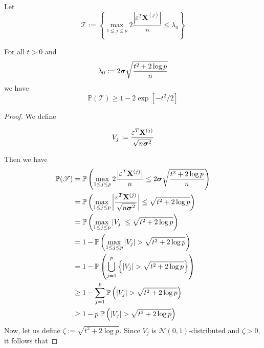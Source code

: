 Let
$$\mathscr{T} := \left\{\max _{1 \leq j \leq p} 2 \frac{\left| \varepsilon^{T} \mathbf{X}^{(j)}\right|}{n} \leq \lambda_{0}\right\}$$

\begin{lemma}[Lemma 6.2.]
    For all $t > 0$ and
    $$\lambda_{0}:=2 \boldsymbol{\sigma} \sqrt{\frac{t^{2}+2 \log p}{n}}$$
    we have
    $$\mathbb{P}(\mathscr{T}) \geq 1-2 \exp \left[-t^{2} / 2\right]$$
\end{lemma}
\begin{proof}
    We define

    $$
        V_{j} := \frac{\varepsilon^{T} \mathbf{X}^{(j)}}{\sqrt{n \boldsymbol{\sigma}^{2}}}
    $$

    Then we have
    \begin{align}
        \nonumber
        \mathbb{P}(\mathscr{T})
         & = \mathbb{P} \left( \max _{1 \leq j \leq p} 2 \frac{\left| \varepsilon^{T} \mathbf{X}^{(j)}\right|}{n} \leq 2 \boldsymbol{\sigma} \sqrt{\frac{t^{2}+2 \log p}{n}}  \right) \\
        \nonumber
         & =
        \mathbb{P} \left( \max _{1 \leq j \leq p} \left| \frac{\varepsilon^{T} \mathbf{X}^{(j)}}{\sqrt{n \boldsymbol{\sigma}^{2}}} \right| \leq \sqrt{t^{2}+2 \log p}  \right)        \\
        \nonumber
         & =
        \mathbb{P} \left( \max _{1 \leq j \leq p} | V_{j} | \leq \sqrt{t^{2}+2 \log p}  \right)                                                                        \\
        \nonumber
         & = 1 - \mathbb{P} \left( \max _{1 \leq j \leq p} | V_{j} | > \sqrt{t^{2}+2 \log p}  \right)                                                                  \\
        \nonumber
         & = 1 - \mathbb{P} \left( \bigcup_{j = 1}^{p} \left\{ | V_{j} | > \sqrt{t^{2}+2 \log p}  \right\} \right)                                                                      \\
        \nonumber
         & \geq 1 - \sum_{j = 1}^{p} \mathbb{P} \left( | V_{j} | > \sqrt{t^{2}+2 \log p}  \right)                                                                      \\
        \label{eqn: proof lemma 6.2.}
         & \geq 1 - p \; \mathbb{P} \left( | V_{j} | > \sqrt{t^{2}+2 \log p}  \right)
    \end{align}
    Now, let us define $\zeta := \sqrt{t^{2}+2 \log p}$. Since $V_j$ is $\mathscr{N} (0,1)$-distributed and $\zeta > 0$, it follows that


\end{proof}
